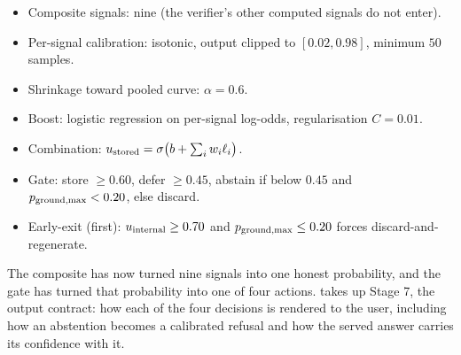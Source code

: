 \begin{bythenumbers}
\begin{itemize}[leftmargin=1.3em, itemsep=1pt]
  \item Composite signals: nine (the verifier's other computed signals do not enter).
  \item Per-signal calibration: isotonic, output clipped to $[0.02, 0.98]$, minimum $50$ samples.
  \item Shrinkage toward pooled curve: $\alpha = 0.6$.
  \item Boost: logistic regression on per-signal log-odds, regularisation $C = 0.01$.
  \item Combination: $u_{\text{stored}} = \sigma\big(b + \sum_i w_i \ell_i\big)$.
  \item Gate: store $\ge 0.60$, defer $\ge 0.45$, abstain if below $0.45$ and $p_{\text{ground,max}} < 0.20$, else discard.
  \item Early-exit (first): $u_{\text{internal}} \ge 0.70$ and $p_{\text{ground,max}} \le 0.20$ forces discard-and-regenerate.
\end{itemize}
\end{bythenumbers}

The composite has now turned nine signals into one honest probability, and the gate
has turned that probability into one of four actions.  takes up
Stage 7, the output contract: how each of the four decisions is rendered to the user,
including how an abstention becomes a calibrated refusal and how the served answer
carries its confidence with it.
